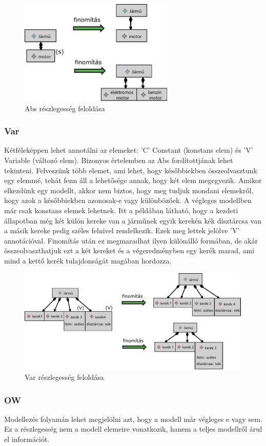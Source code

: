 \begin{figure}[!ht]
\centering
\includegraphics[height=50mm, keepaspectratio]{figures/abs.pdf}
\caption{Abs részlegesség feloldása} 
\end{figure}

\subsubsection{Var}
Kétféleképpen lehet annotálni az elemeket: ’C’ Constant (konstans elem) és ’V’ Variable (változó elem). Bizonyos értelemben az Abs fordítottjának lehet tekinteni. Felveszünk több elemet, ami lehet, hogy későbbiekben összeolvasztunk egy elemmé, tehát fenn áll a lehetősége annak, hogy két elem megegyezik. Amikor elkezdünk egy modellt, akkor nem biztos, hogy meg tudjuk mondani elemekről, hogy azok a későbbiekben azonosak-e vagy különbözőek. A végleges modellben már csak konstans elemek lehetnek.
Itt a példában látható, hogy a kezdeti állapotban még két külön kereke van a járműnek egyik kerekén kék dísztárcsa van a másik kereke pedig széles felnivel rendelkezik. Ezek meg lettek jelölve 'V' annotációval. Finomítás után ez megmaradhat ilyen különálló formában, de akár összeolvaszthatjuk ezt a két kereket és a végeredményben egy kerék marad, ami mind a kettő kerék tulajdonságát magában hordozza.

\begin{figure}[!ht]
	\centering
	\includegraphics[height=50mm, keepaspectratio]{figures/var.pdf}
	\caption{Var részlegesség feloldása} 
\end{figure}

\subsubsection{OW}
Modellezés folyamán lehet megjelölni azt, hogy a modell már végleges e vagy sem. Ez a részlegesség nem a modell elemeire vonatkozik, hanem a teljes modellről árul el információt. 
